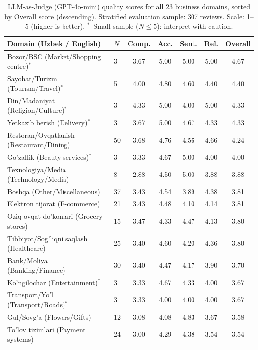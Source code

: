 \documentclass[bdcc,article,submit,moreauthors]{Definitions/mdpi}
\begin{document}
\begin{table}[H]
\centering
\caption{LLM-as-Judge (GPT-4o-mini) quality scores for all 23 business domains, sorted by Overall score (descending). Stratified evaluation sample: 307 reviews. Scale: 1--5 (higher is better). $^{*}$~Small sample ($N \leq 5$): interpret with caution.\label{tab:domain_quality_full}}
\setlength{\tabcolsep}{3.5pt}
\small
\begin{tabular}{llccccc}
\toprule
\textbf{Domain (Uzbek / English)} & $N$ & \textbf{Comp.} & \textbf{Acc.} & \textbf{Sent.} & \textbf{Rel.} & \textbf{Overall} \\
\midrule
Bozor/BSC (Market/Shopping centre)$^{*}$ & 3  & 3.67 & 5.00 & 5.00 & 5.00 & 4.67 \\
Sayohat/Turizm (Tourism/Travel)$^{*}$   & 5  & 4.00 & 4.80 & 4.60 & 4.40 & 4.40 \\
Din/Madaniyat (Religion/Culture)$^{*}$   & 3  & 4.33 & 5.00 & 4.00 & 5.00 & 4.33 \\
Yetkazib berish (Delivery)$^{*}$          & 3  & 3.67 & 5.00 & 4.67 & 4.33 & 4.33 \\
Restoran/Ovqatlanish (Restaurant/Dining)      & 50 & 3.68 & 4.76 & 4.56 & 4.66 & 4.24 \\
Go'zallik (Beauty services)$^{*}$         & 3  & 3.33 & 4.67 & 5.00 & 4.00 & 4.00 \\
Texnologiya/Media (Technology/Media)          & 8  & 2.88 & 4.50 & 5.00 & 3.88 & 3.88 \\
Boshqa (Other/Miscellaneous)                  & 37 & 3.43 & 4.54 & 3.89 & 4.38 & 3.81 \\
Elektron tijorat (E-commerce)                 & 21 & 3.43 & 4.48 & 4.10 & 4.14 & 3.81 \\
Oziq-ovqat do'konlari (Grocery stores)        & 15 & 3.47 & 4.33 & 4.47 & 4.13 & 3.80 \\
Tibbiyot/Sog'liqni saqlash (Healthcare)       & 25 & 3.40 & 4.60 & 4.20 & 4.36 & 3.80 \\
Bank/Moliya (Banking/Finance)                 & 30 & 3.40 & 4.47 & 4.17 & 3.90 & 3.70 \\
Ko'ngilochar (Entertainment)$^{*}$        & 3  & 3.33 & 4.67 & 4.33 & 4.00 & 3.67 \\
Transport/Yo'l (Transport/Roads)$^{*}$    & 3  & 3.33 & 4.00 & 4.00 & 4.00 & 3.67 \\
Gul/Sovg'a (Flowers/Gifts)                    & 12 & 3.08 & 4.08 & 4.83 & 3.67 & 3.58 \\
To'lov tizimlari (Payment systems)            & 24 & 3.00 & 4.29 & 4.38 & 3.54 & 3.54 \\

\end{tabular}
\end{table}
\end{document}
